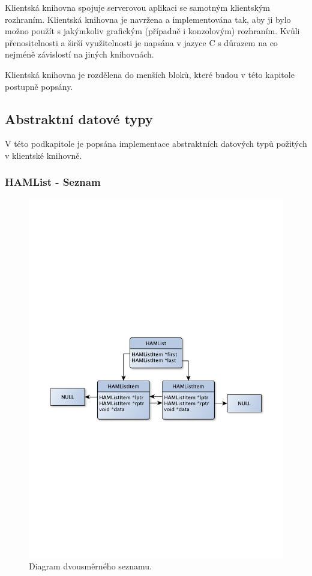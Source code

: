 Klientská knihovna spojuje serverovou aplikaci se samotným klientským rozhraním.
Klientská knihovna je navržena a implementována
tak, aby ji bylo možno použít s jakýmkoliv grafickým (případně i konzolovým) rozhraním. Kvůli přenositelnosti a
širší využitelnosti je napsána v jazyce C s důrazem na co nejméně závislostí na jiných knihovnách.

Klientská knihovna je rozdělena do menších bloků, které budou v této kapitole
postupně popsány.

\subsection{Abstraktní datové typy}

V této podkapitole je popsána implementace abstraktních datových typů požitých v klientské knihovně.
\subsubsection{HAMList - Seznam}

\begin{figure}[h]
\centering
\includegraphics[trim=8cm 8cm 8cm 8cm, scale=0.6]{fig/list}
\caption{Diagram dvousměrného seznamu.}
\label{fig:FigureExample}
\end{figure}

